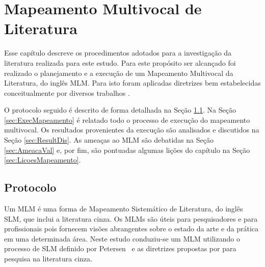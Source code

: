 \chapter{Mapeamento Multivocal de Literatura}\label{mapeamentoLiteratura}

Esse capítulo descreve os procedimentos adotados para a investigação da literatura realizada para este estudo. 
Para este propósito ser alcançado foi realizado o planejamento e a execução de um Mapeamento Multivocal da Literatura, do inglês \ac{MLM}. 
Para isto foram aplicadas diretrizes bem estabelecidas conceitualmente por diversos trabalhos \cite{Kitchenham:2007, Petersen:2008, Nakagawa:2017}.  

O protocolo seguido é descrito de forma detalhada na Seção \ref{sec:Protocolo}. 
Na Seção \ref{sec:ExecMapeamento} é relatado todo o processo de execução do mapeamento multivocal. 
Os resultados provenientes da execução são analisados e discutidos na Seção \ref{sec:ResultDis}. 
As ameaças ao \ac{MLM} são debatidas na Seção \ref{sec:AmeacaVal} e, por fim, são pontuadas algumas lições do capítulo na Seção \ref{sec:LicoesMapeamento}.


\section{Protocolo} \label{sec:Protocolo}

Um \ac{MLM} é uma forma de Mapeamento Sistemático de Literatura, do inglês \ac{SLM}, que inclui a literatura cinza. 
Os \acp{MLM} são úteis para pesquisadores e para profissionais pois fornecem visões abrangentes sobre o estado da arte e da prática em uma determinada área. 
Neste estudo conduziu-se um \ac{MLM} utilizando o processo de \ac{SLM} definido por Petersen~\cite{Petersen:2008} e as diretrizes propostas por  para pesquisa na literatura cinza.

